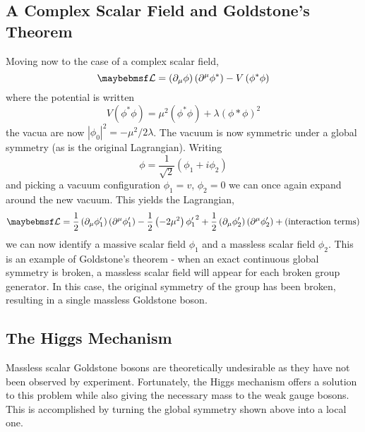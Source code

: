 \subsection{A Complex Scalar Field and Goldstone's Theorem}
Moving now to the case of a complex scalar field,
\begin{equation}
\lagrangiand = \left(\partial_{\mu}\phi\right)\left(\partial^{\mu}\phi^*\right)
- V\left(\phi^*\phi\right)
\end{equation}
where the potential is written
\begin{equation}
V\left(\phi^*\phi\right) = \mu^2\left(\phi^*\phi\right) +
\lambda\left(\phi*\phi\right)^2
\end{equation}
the vacua are now $\left|\phi_0\right|^2 = -\mu^2/2\lambda$. The vacuum is now
symmetric under a global \Uone symmetry (as is the original Lagrangian). Writing
\begin{equation}
\phi = \frac{1}{\sqrt{2}}\left(\phi_1 + i\phi_2\right)
\end{equation}
and picking a vacuum configuration $\phi_1 = v$, $\phi_2 = 0$ we can once again
expand around the new vacuum. This yields the Lagrangian,
\begin{equation}
  \lagrangiand =
  \frac{1}{2}\left(\partial_{\mu}\phi'_1\right)\left(\partial^{\mu}\phi'_1\right)
  -\frac{1}{2}\left(-2\mu^2\right){\phi'_1}^2 +
  \frac{1}{2}\left(\partial_{\mu}\phi'_2\right)\left(\partial^{\mu}\phi'_2\right)
  + \textrm{(interaction terms)}
\end{equation}
we can now identify a massive scalar field $\phi_1$ and a massless scalar field
$\phi_2$. This is an example of Goldstone's theorem - when an exact continuous
global symmetry is broken, a massless scalar field will appear for each broken
group generator. In this case, the original \Uone symmetry of the group has been
broken, resulting in a single massless Goldstone boson.

\subsection{The Higgs Mechanism}
Massless scalar Goldstone bosons are theoretically undesirable as they have not
been observed by experiment. Fortunately, the Higgs mechanism\cite{higgs} offers
a solution to this problem while also giving the necessary mass to the weak
gauge bosons. This is accomplished by turning the global symmetry shown above
into a local one.

